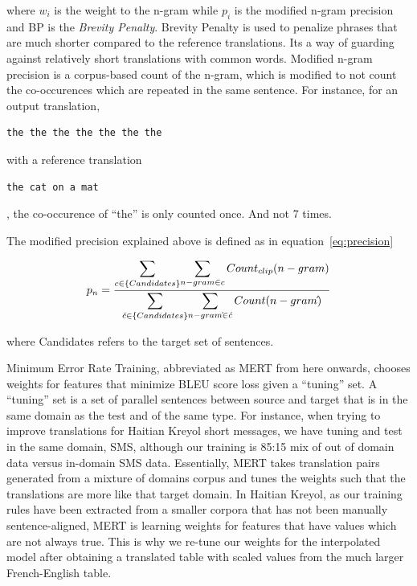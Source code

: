 where $w_{i}$ is the weight to the n-gram while $p_{i}$ is the modified n-gram precision and BP is the \emph{Brevity Penalty}. 
Brevity Penalty is used to penalize phrases that are much shorter compared to the reference translations. Its a way of guarding against relatively short translations with common words. 
Modified n-gram precision is a corpus-based count of the n-gram, which is modified to not count the co-occurences which are repeated in the same sentence. For instance, for an output translation, \begin{verbatim}the the the the the the the\end{verbatim} with a reference translation \begin{verbatim}the cat on a mat\end{verbatim}, the co-occurence of ``the'' is only counted once. And not 7 times. 

The modified precision explained above is defined as in equation~\eqref{eq:precision}

\begin{equation} \label{eq:precision}
	p_{n} = \frac{\mathlarger{\sum\limits_{c \in \{Candidates\}}} \mathlarger{\sum\limits_{n-gram \in c}Count_{clip}(n-gram)}}
			{\mathlarger{\sum\limits_{\acute{c} \in \{Candidates\}}} \mathlarger{\sum\limits_{n-gram\acute{} \in \acute{c}}Count(n-gram\acute{})}}
\end{equation}

where Candidates refers to the target set of sentences. 

Minimum Error Rate Training, abbreviated as MERT from here onwards, chooses weights for features that minimize BLEU score loss given a ``tuning'' set. A ``tuning'' set is a set of parallel sentences between source and target that is in the same domain as the test and of the same type. For instance, when trying to improve translations for Haitian Kreyol short messages, we have tuning and test in the same domain, SMS, although our training is 85:15 mix of out of domain data versus in-domain SMS data. Essentially, MERT takes translation pairs generated from a mixture of domains corpus and tunes the weights such that the translations are more like that target domain. In Haitian Kreyol, as our training rules have been extracted from a smaller corpora that has not been manually sentence-aligned, MERT is learning weights for features that have values which are not always true. This is why we re-tune our weights for the interpolated model after obtaining a translated table with scaled values from the much larger French-English table. 


